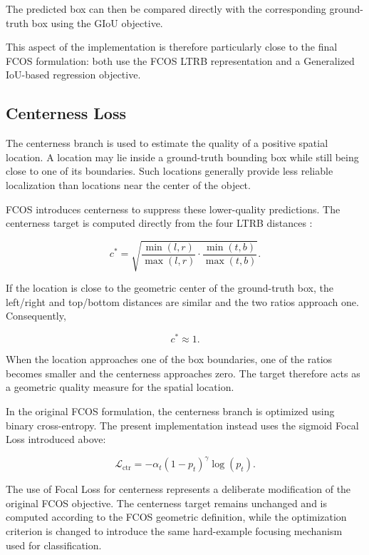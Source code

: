 \documentclass[11pt,a4paper]{article}
\begin{document}
The predicted box can then be compared directly with the corresponding
ground-truth box using the GIoU objective.

This aspect of the implementation is therefore particularly close to the
final FCOS formulation: both use the FCOS LTRB representation and a
Generalized IoU-based regression objective.

\subsection{Centerness Loss}
\label{subsec:centerness_loss}

The centerness branch is used to estimate the quality of a positive spatial
location. A location may lie inside a ground-truth bounding box while still
being close to one of its boundaries. Such locations generally provide less
reliable localization than locations near the center of the object.

FCOS introduces centerness to suppress these lower-quality predictions.
The centerness target is computed directly from the four LTRB distances
\cite{tian2019fcos}:

\begin{equation}
c^*
=
\sqrt{
\frac{\min(l,r)}{\max(l,r)}
\cdot
\frac{\min(t,b)}{\max(t,b)}
}.
\end{equation}

If the location is close to the geometric center of the ground-truth box,
the left/right and top/bottom distances are similar and the two ratios
approach one. Consequently,

\begin{equation}
c^* \approx 1.
\end{equation}

When the location approaches one of the box boundaries, one of the ratios
becomes smaller and the centerness approaches zero. The target therefore
acts as a geometric quality measure for the spatial location.

In the original FCOS formulation, the centerness branch is optimized using
binary cross-entropy. The present implementation instead uses the sigmoid
Focal Loss introduced above:

\begin{equation}
\mathcal{L}_{\mathrm{ctr}}
=
-\alpha_t(1-p_t)^\gamma\log(p_t).
\end{equation}

The use of Focal Loss for centerness represents a deliberate modification of
the original FCOS objective. The centerness target remains unchanged and is
computed according to the FCOS geometric definition, while the optimization
criterion is changed to introduce the same hard-example focusing mechanism
used for classification.
\end{document}
